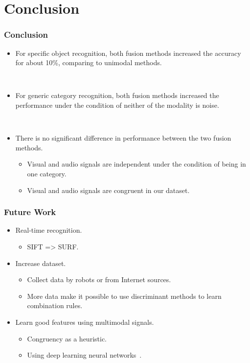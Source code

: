 \documentclass{beamer}
\begin{document}
  \section{Conclusion}
  \begin{frame}
    \frametitle{Conclusion}

    \begin{itemize}
      \item For specific object recognition, both fusion methods increased the accuracy for about 10\%, comparing to unimodal methods.

        ~
      \item For generic category recognition, both fusion methods increased the performance under the condition of neither of the modality is noise.

        ~
      \item There is no significant difference in performance between the two fusion methods.
        \begin{itemize}
          \item Visual and audio signals are independent under the condition of being in one category.
          \item Visual and audio signals are congruent in our dataset.
        \end{itemize}
    \end{itemize}
  \end{frame}

  \begin{frame}
    \frametitle{Future Work}

    \begin{itemize}
      \item Real-time recognition.
        \begin{itemize}
          \item SIFT => SURF.
        \end{itemize}

      \item Increase dataset.
        \begin{itemize}
          \item Collect data by robots or from Internet sources.
          \item More data make it possible to use discriminant methods to learn combination rules.
        \end{itemize}

      \item Learn good features using multimodal signals.
        \begin{itemize}
          \item Congruency as a heuristic.
          \item Using deep learning neural networks~\cite{ngiam_multimodal_2011}.
        \end{itemize}
    \end{itemize}
  \end{frame}
\end{document}
